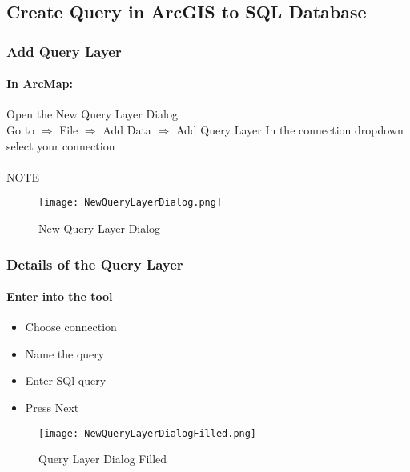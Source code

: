 \documentclass[class=article , crop=false, titlepage, twoside, multi={itemize, figure, verbatim}, float=false]{standalone}
\title{}  %
\begin{document}
\ifstandalone
\maketitle %
\tableofcontents %
\clearpage
\fi

\subsection{Create Query in ArcGIS to SQL Database}
\medskip
\subsubsection[Add Query Layer ]{\Large Add Query Layer}
\paragraph*{In ArcMap: \texorpdfstring{\\}{}}
Open the New Query Layer Dialog\\
Go to $\Rightarrow$ File $\Rightarrow$ Add Data $\Rightarrow$ Add Query Layer
In the connection dropdown select your connection
\paragraph*{}NOTE
\begin{figure}[h!]
\centering
    \texttt{[image: NewQueryLayerDialog.png]}
\caption{New Query Layer Dialog}
\end{figure}
\clearpage
\subsubsection[Details of the Query Layer]{\Large Details of the Query Layer}
\paragraph*{Enter into the tool \texorpdfstring{\\}{}}
\begin{itemize}
  \item Choose connection
  \item Name the query
  \item Enter SQl query
  \item Press Next
\end{itemize}
\begin{figure}[h!]
\centering
    \texttt{[image: NewQueryLayerDialogFilled.png]}
\caption{Query Layer Dialog Filled}
\end{figure}
\clearpage
\end{document}
